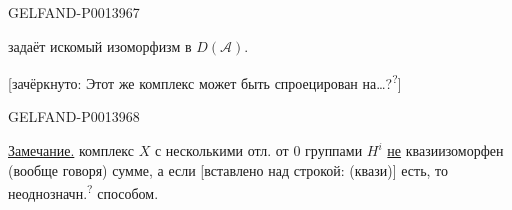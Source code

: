 \begin{GelfandAdjacentEvidence}{GELFAND-P001396}{7}

задаёт искомый изоморфизм в \(D(\mathcal A)\).

[зачёркнуто:
Этот же комплекс может быть спроецирован на…?\textsuperscript{?}]
\end{GelfandAdjacentEvidence}
\begin{GelfandAdjacentEvidence}{GELFAND-P001396}{8}


\uline{Замечание.} комплекс \(X\) с несколькими отл. от \(0\) группами \(H^i\) 
\uline{не} квазиизоморфен (вообще говоря) сумме, а если
[вставлено над строкой: (квази)] есть, то неоднозначн.\textsuperscript{?} способом.
\end{GelfandAdjacentEvidence}




